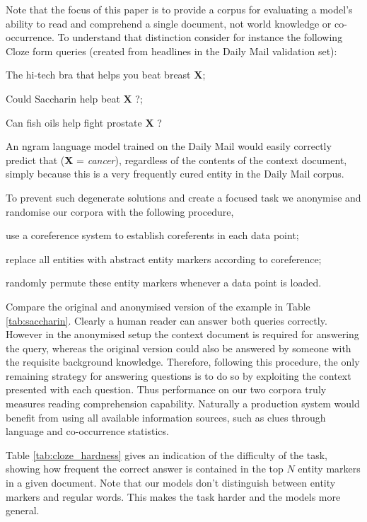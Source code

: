 Note that the focus of this paper is to provide a corpus for evaluating a model's
ability to read and comprehend a single document, not world knowledge or
co-occurrence. To understand that distinction consider for instance the
following Cloze form queries (created from headlines in the Daily Mail
validation set):
\begin{inparaenum}
  \item The hi-tech bra that helps you beat breast \textbf{X};
  \item Could Saccharin help beat \textbf{X} ?;
  \item Can fish oils help fight prostate \textbf{X} ?
\end{inparaenum}
An ngram language model trained on the Daily Mail would easily correctly predict
that (\textbf{X} = \textit{cancer}), regardless of the contents of the context
document, simply because this is a very frequently cured entity in the Daily Mail
corpus.

To prevent such degenerate solutions and create a focused task we anonymise and
randomise our corpora with the following procedure,
\begin{inparaenum}
  \item use a coreference system to establish coreferents in each
    data point;
  \item replace all entities with abstract entity markers according to
    coreference;
  \item randomly permute these entity markers whenever a data point is loaded.
\end{inparaenum}

Compare the original and anonymised version of the example in Table
\ref{tab:saccharin}. Clearly a human reader can answer both queries correctly.
However in the anonymised setup the context document is required for answering
the query, whereas the original version could also be answered by someone with
the requisite background knowledge.
Therefore, following this procedure, the only remaining strategy for answering
questions is to do so by exploiting the context presented with each question.
Thus performance on our two corpora truly measures reading comprehension
capability.  Naturally a production system would benefit from using all
available information sources, such as clues through language and co-occurrence
statistics.

Table \ref{tab:cloze_hardness} gives an indication of the difficulty of the
task, showing how frequent the correct answer is contained in the top $N$ entity
markers in a given document. Note that our models don't distinguish between
entity markers and regular words. This makes the task harder and the models more
general.

